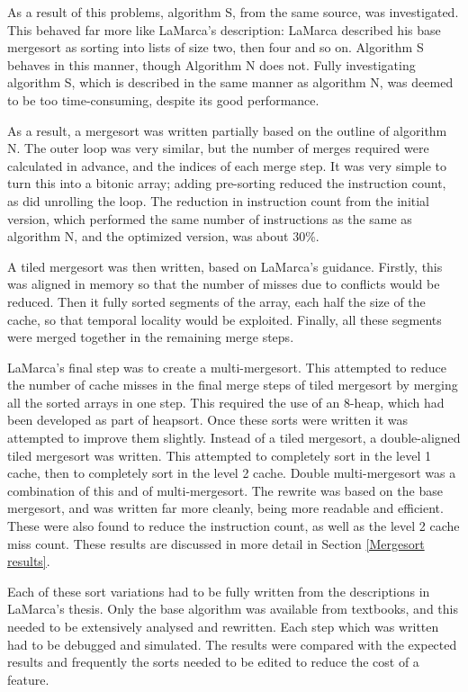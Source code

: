 As a result of this problems, algorithm S, from the same source, was
investigated. This behaved far more like LaMarca's description: LaMarca
described his base mergesort as sorting into lists of size two, then four and
so on. Algorithm S behaves in this manner, though Algorithm N does not. Fully
investigating algorithm S, which is described in the same manner as algorithm N,
was deemed to be too time-consuming, despite its good performance.

As a result, a mergesort was written partially based on the outline of algorithm
N. The outer loop was very similar, but the number of merges required were
calculated in advance, and the indices of each merge step.  It was very simple
to turn this into a bitonic array; adding pre-sorting reduced the instruction
count, as did unrolling the loop. The reduction in instruction count from the
initial version, which performed the same number of instructions as the same as
algorithm N, and the optimized version, was about 30\%.

A tiled mergesort was then written, based on LaMarca's guidance. Firstly, this
was aligned in memory so that the number of misses due to conflicts would be
reduced.  Then it fully sorted segments of the array, each half the size of the
cache, so that temporal locality would be exploited. Finally, all these segments
were merged together in the remaining merge steps.

LaMarca's final step was to create a multi-mergesort. This attempted to reduce
the number of cache misses in the final merge steps of tiled mergesort by
merging all the sorted arrays in one step. This required the use of an 8-heap,
which had been developed as part of heapsort.
Once these sorts were written it was attempted to improve them slightly.
Instead of a tiled mergesort, a double-aligned tiled mergesort was written.  This
attempted to completely sort in the level 1 cache, then to completely sort in
the level 2 cache. Double multi-mergesort was a combination of this and of
multi-mergesort. The rewrite was based on the base mergesort, and was written
far more cleanly, being more readable and efficient. These were also found to
reduce the instruction count, as well as the level 2 cache miss count. These
results are discussed in more detail in Section \ref{Mergesort results}.

Each of these sort variations had to be fully written from the descriptions in
LaMarca's thesis. Only the base algorithm was available from textbooks, and this
needed to be extensively analysed and rewritten. Each step which was written had
to be debugged and simulated. The results were compared with the expected
results and frequently the sorts needed to be edited to reduce the cost of a
feature.

